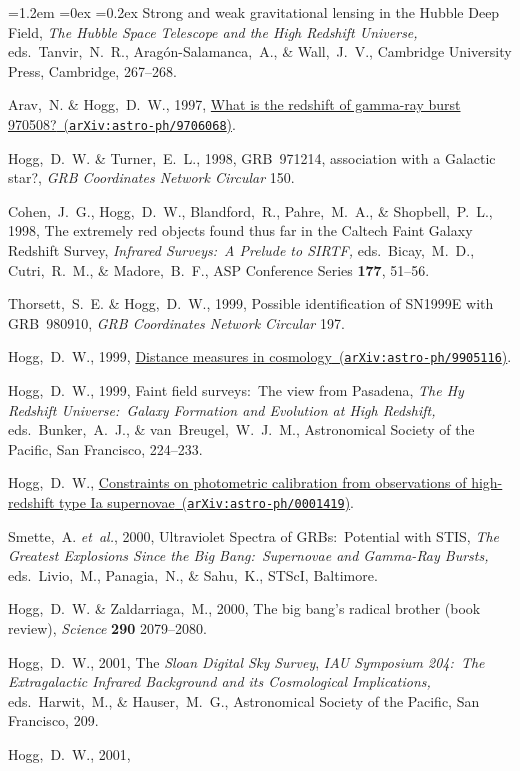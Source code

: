 \documentclass[10pt,letterpaper]{article}
\newcommand{\acronym}[1]{{\small{#1}}}
\newcommand{\foreign}[1]{\textsl{#1}}
\newcommand{\etal}{\foreign{et~al.}}
\newcommand{\project}[1]{\textsl{#1}}
\newcommand{\arxiv}[2]{\href{http://arxiv.org/abs/#1}{{#2}\ (\texttt{arXiv:#1})}}
\newcounter{refpubnum}
\newcommand{\hogglist}{%
    \rightmargin=0in
    \leftmargin=1.2em
    \topsep=0ex
    \partopsep=0pt
    \itemsep=0.2ex
    \parsep=0pt
    \itemindent=-1.0\leftmargin
    \listparindent=0.0\leftmargin
    \settowidth{\labelsep}{~}
    \usecounter{refpubnum}
  }
\begin{document}
\begin{list}{}{\hogglist}
{Strong and weak gravitational
lensing in the Hubble Deep Field},
\textit{The \project{Hubble Space
Telescope} and the High Redshift Universe,} eds.\ Tanvir,~N.~R.,
Arag\'on-Salamanca,~A., \& Wall,~J.~V., Cambridge University Press,
Cambridge, 267--268.
\item
Arav,~N. \& Hogg,~D.~W., 1997,
\arxiv{astro-ph/9706068}{What is the redshift of gamma-ray burst 970508?}.
\item
Hogg,~D.~W. \& Turner,~E.~L., 1998,
{\acronym{GRB}~971214, association with a Galactic star?},
\textit{\acronym{GRB} Coordinates Network Circular} 150.
\item
Cohen,~J.~G., Hogg,~D.~W., Blandford,~R., Pahre,~M.~A., \& Shopbell,~P.~L., 1998,
{The extremely red objects found thus far in the Caltech Faint Galaxy Redshift Survey},
\textit{Infrared Surveys:\ A Prelude to SIRTF,} eds.\ Bicay,~M.~D., Cutri,~R.~M., \& Madore,~B.~F.,
ASP Conference Series \textbf{177}, 51--56.
\item
Thorsett,~S.~E. \& Hogg,~D.~W., 1999,
{Possible identification of SN1999E with \acronym{GRB}~980910},
\textit{\acronym{GRB} Coordinates Network Circular} 197.
\item
Hogg,~D.~W., 1999,
\arxiv{astro-ph/9905116}{Distance measures in cosmology}.
\item
Hogg,~D.~W., 1999,
{Faint field surveys:\ The view from Pasadena},
\textit{The Hy Redshift Universe:\ Galaxy Formation and Evolution at
High Redshift,} eds.\ Bunker,~A.~J., \& van~Breugel,~W.~J.~M.,
Astronomical Society of the Pacific, San Francisco, 224--233.
\item
Hogg,~D.~W.,
\arxiv{astro-ph/0001419}{Constraints on photometric calibration from observations of high-redshift type Ia supernovae}.
\item
Smette,~A. \etal, 2000,
{Ultraviolet Spectra of \acronym{GRB}s:\ Potential with
\acronym{STIS}},
\textit{The Greatest Explosions Since the Big Bang:\ Supernovae
and Gamma-Ray Bursts,} eds.\ Livio,~M., Panagia,~N., \& Sahu,~K.,
STScI, Baltimore.
\item
Hogg,~D.~W. \& Zaldarriaga,~M., 2000,
{The big bang's radical brother
(book review)},
\textit{Science} \textbf{290} 2079--2080.
\item
Hogg,~D.~W., 2001,
{The \project{Sloan Digital Sky Survey}},
\textit{IAU Symposium 204:\ The Extragalactic Infrared Background and
its Cosmological Implications,} eds.\ Harwit,~M., \& Hauser,~M.~G.,
Astronomical Society of the Pacific, San Francisco, 209.
\item
Hogg,~D.~W., 2001,

\end{list}
\end{document}
